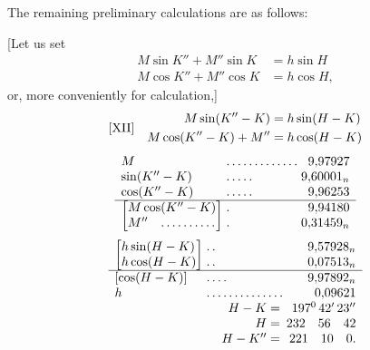 The remaining preliminary calculations are as follows:

[Let us set
\[
\begin{aligned}
M\sin K''+M''\sin K&=h\sin H\\
M\cos K''+M''\cos K&=h\cos H,
\end{aligned}
\]
or, more conveniently for calculation,]
\[
\begin{array}{l@{\quad}l}
[\mathrm{XII}]&\begin{aligned}
M\sin(K''-K)&=h\sin(H-K)\\
M\cos(K''-K)+M''&=h\cos(H-K)
\end{aligned}
\end{array}
\]
\[
\begin{array}{l@{\;}l@{\;}r}
M&\mathord{.}\,\mathord{.}\,\mathord{.}\,\mathord{.}\,\mathord{.}\,\mathord{.}\,\mathord{.}\,\mathord{.}\,\mathord{.}\,\mathord{.}\,\mathord{.}\,\mathord{.}\,\mathord{.}&9{,}97927\\
\sin(K''-K)&\mathord{.}\,\mathord{.}\,\mathord{.}\,\mathord{.}\,\mathord{.}&9{,}60001_n\\
\cos(K''-K)&\mathord{.}\,\mathord{.}\,\mathord{.}\,\mathord{.}\,\mathord{.}&9{,}96253\\\hline
\left[\begin{array}{@{}l@{}}M\cos(K''-K)\\M''\quad\mathord{.}\,\mathord{.}\,\mathord{.}\,\mathord{.}\,\mathord{.}\,\mathord{.}\,\mathord{.}\,\mathord{.}\,\mathord{.}\,\mathord{.}\end{array}\right]&
\begin{array}{@{}l@{}}\mathord{.}\\\mathord{.}\end{array}&
\begin{array}{@{}r@{}}9{,}94180\\0{,}31459_n\end{array}
\end{array}
\]
\[
\begin{array}{l@{\;}l@{\;}r}
\left[\begin{array}{@{}l@{}}h\sin(H-K)\\h\cos(H-K)\end{array}\right]&
\begin{array}{@{}l@{}}\mathord{.}\,\mathord{.}\\\mathord{.}\,\mathord{.}\end{array}&
\begin{array}{@{}r@{}}9{,}57928_n\\0{,}07513_n\end{array}\\\hline
[\cos(H-K)]&\mathord{.}\,\mathord{.}\,\mathord{.}\,\mathord{.}&9{,}97892_n\\
h&\mathord{.}\,\mathord{.}\,\mathord{.}\,\mathord{.}\,\mathord{.}\,\mathord{.}\,\mathord{.}\,\mathord{.}\,\mathord{.}\,\mathord{.}\,\mathord{.}\,\mathord{.}\,\mathord{.}\,\mathord{.}&0{,}09621\\
\multicolumn{2}{r}{H-K=}&197^{0}\,42'\,23''\\
\multicolumn{2}{r}{H=}&232\quad56\quad42\\
\multicolumn{2}{r}{H-K''=}&221\quad10\quad0.
\end{array}
\]

